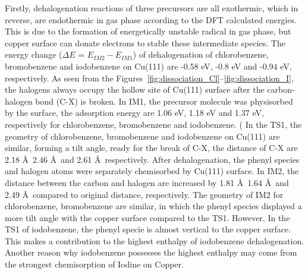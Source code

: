 \documentclass[%
 reprint,
 amsmath,amssymb,
 aps,
prb,
]{revtex4-2}
\begin{document}
Firstly, dehalogenation reactions of three precursors are all exothermic, which in reverse, are endothermic in gas phase according to the DFT calculated energies. This is due to the formation of energetically unstable radical in gas phase, but copper surface can donate electrons to stable these intermediate species.
The energy change ($\Delta E$ = $E_{IM2} - E_{IM1}$) of dehalogenation of chlorobenzene, bromobenzene and iodobenzene on Cu(111) are -0.58 eV, -0.8 eV and -0.94 eV, respectively. As seen from the Figures~\ref{fig:dissociation_Cl}--\ref{fig:dissociation_I}, the halogens always occupy the hollow site of Cu(111) surface after the carbon-halogen bond (C-X) is broken. 
In IM1, the precursor molecule was physisorbed by the surface, the adsorption energy are 1.06 eV, 1.18 eV and 1.37 eV, respectively for chlorobenzene, bromobenzene and iodobenzene. (%
%
In the TS1, the geometry of chlorobenzene, bromobenzene and iodobenzene on Cu(111) are similar, forming a tilt angle, ready for the break of C-X, the distance of C-X are 2.18 \AA\, 2.46 \AA\ and 2.61 \AA\, respectively. 
After dehalogenation, the phenyl species and halogen atoms were separately chemisorbed by Cu(111) surface. In IM2, the distance between the carbon and halogen are increased by 1.81 \AA\, 1.64 \AA\ and 2.49 \AA\ compared to original distance, respectively. The geometry of IM2 for chlorobenzene, bromobenzene are similar, in which the phenyl species displayed a more tilt angle with the copper surface compared to the TS1. 
However, In the TS1 of iodobenzene, the phenyl specie is almost vertical to the copper surface. This makes a contribution to the highest enthalpy of iodobenzene dehalogenation. Another reason why iodobenzene possesses the highest enthalpy may come from the strongest chemisorption of Iodine on Copper. 
\end{document}
